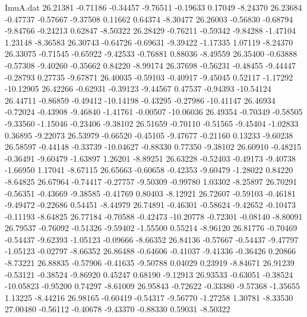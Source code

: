 \begin{filecontents}{ImuA.dat}
  26.21381   -0.71186   -0.34457   -9.76511   -0.19633    0.17049   -8.24370
  26.23684   -0.47737   -0.57667   -9.37508    0.11662    0.64374   -8.30477
  26.26003   -0.56830   -0.68794   -9.84766   -0.24213    0.62847   -8.50322
  26.28429   -0.76211   -0.59342   -9.84288   -1.47104    1.23148   -8.36583
  26.30743   -0.64726   -0.69631   -9.39422   -1.17335    1.07119   -8.24370
  26.33075   -0.71545   -0.65922   -9.42533   -0.76881    0.88036   -8.49559
  26.35400   -0.63888   -0.57308   -9.40260   -0.35662    0.84220   -8.99174
  26.37698   -0.56231   -0.48455   -9.44447   -0.28793    0.27735   -9.67871
  26.40035   -0.59103   -0.40917   -9.45045    0.52117   -1.17292  -10.12905
  26.42266   -0.62931   -0.39123   -9.44567    0.47537   -0.94393  -10.54124
  26.44711   -0.86859   -0.49412  -10.14198   -0.43295   -0.27986  -10.41147
  26.46934   -0.72024   -0.43908   -9.46840   -1.41761   -0.00507  -10.06036
  26.49354   -0.70349   -0.58505   -9.33560   -1.15046   -0.23406   -9.38102
  26.51659   -0.70110   -0.51565   -9.45404   -1.02833    0.36895   -9.22073
  26.53979   -0.66520   -0.45105   -9.47677   -0.21160    0.13233   -9.60238
  26.58597   -0.44148   -0.33739  -10.04627   -0.88330    0.77350   -9.38102
  26.60910   -0.48215   -0.36491   -9.60479   -1.63897    1.26201   -8.89251
  26.63228   -0.52403   -0.49173   -9.40738   -1.66950    1.17041   -8.67115
  26.65663   -0.60658   -0.42353   -9.60479   -1.28022    0.84220   -8.64825
  26.67964   -0.74417   -0.27757   -9.50309   -0.99780    1.03302   -8.25897
  26.70291   -0.56351   -0.43669   -9.38585   -0.41769    0.80403   -8.12921
  26.72607   -0.59103   -0.46181   -9.49472   -0.22686    0.54451   -8.44979
  26.74891   -0.46301   -0.58624   -9.42652   -0.10473   -0.11193   -8.64825
  26.77184   -0.70588   -0.42473  -10.20778   -0.72301   -0.08140   -8.80091
  26.79537   -0.76092   -0.51326   -9.59402   -1.55500    0.55214   -8.96120
  26.81776   -0.70469   -0.54437   -9.62393   -1.05123   -0.09666   -8.66352
  26.84136   -0.57667   -0.54437   -9.47797   -1.05123   -0.02797   -8.66352
  26.86488   -0.64606   -0.41037   -9.41336   -0.36426    0.20866   -8.73221
  26.88835   -0.57906   -0.41635   -9.50788    0.04029    0.23919   -8.84671
  26.91239   -0.53121   -0.38524   -9.86920    0.45247    0.68190   -9.12913
  26.93533   -0.63051   -0.38524  -10.05823   -0.95200    0.74297   -8.61009
  26.95843   -0.72622   -0.33380   -9.57368   -1.35655    1.13225   -8.44216
  26.98165   -0.60419   -0.54317   -9.56770   -1.27258    1.30781   -8.33530
  27.00480   -0.56112   -0.40678   -9.43370   -0.88330    0.59031   -8.50322

\end{filecontents}
